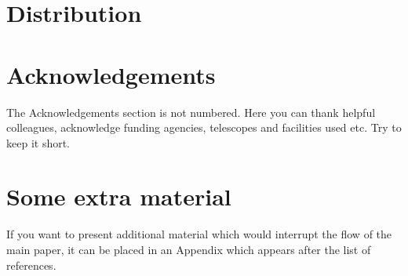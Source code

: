 \documentclass[fleqn,usenatbib]{mnras}
\begin{document}
\section{Distribution}

\section*{Acknowledgements}

The Acknowledgements section is not numbered. Here you can thank helpful
colleagues, acknowledge funding agencies, telescopes and facilities used etc.
Try to keep it short.











\appendix

\section{Some extra material}

If you want to present additional material which would interrupt the flow of the main paper,
it can be placed in an Appendix which appears after the list of references.



\bsp	%
\label{lastpage}
\end{document}
